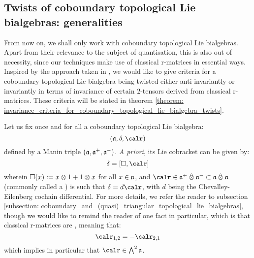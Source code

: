     \subsection{Twists of coboundary topological Lie bialgebras: generalities} \label{subsection: twisted_coboundary_topological_lie_bialgebras_generalities}
        From now on, we shall only work with coboundary topological Lie bialgebras. Apart from their relevance to the subject of quantisation, this is also out of necessity, since our techniques make use of classical r-matrices in essential ways. Inspired by the approach taken in \cite{schrader_integrable_systems_from_classical_reflection_equations}, we would like to give criteria for a coboundary topological Lie bialgebra being twisted either anti-invariantly or invariantly in terms of invariance of certain $2$-tensors derived from classical r-matrices. These criteria will be stated in theorem \ref{theorem: invariance_criteria_for_coboundary_topological_lie_bialgebra_twists}.

        Let us fix once and for all a coboundary topological Lie bialgebra:
            $$(\a, \delta, \calr)$$
        defined by a Manin triple $(\mathfrak{a}, \mathfrak{a}^+, \mathfrak{a}^-)$. \textit{A priori}, its Lie cobracket can be given by:
            $$\delta = [ \Box, \calr ]$$
        wherein $\Box(x) := x \tensor 1 + 1 \tensor x$ for all $x \in \mathfrak{a}$, and $\calr \in \a^+ \hattensor \a^- \subset \a \hattensor \a$ (commonly called a ) is such that $\delta = d\calr$, with $d$ being the Chevalley-Eilenberg cochain differential. For more details, we refer the reader to subsection \ref{subsection: coboundary_and_(quasi)_triangular_topological_lie_bialgebras}, though we would like to remind the reader of one fact in particular, which is that classical r-matrices are , meaning that:
            $$\calr_{1, 2} = -\calr_{2, 1}$$
        which implies in particular that $\calr \in \bigwedge^2 \a$.
        
